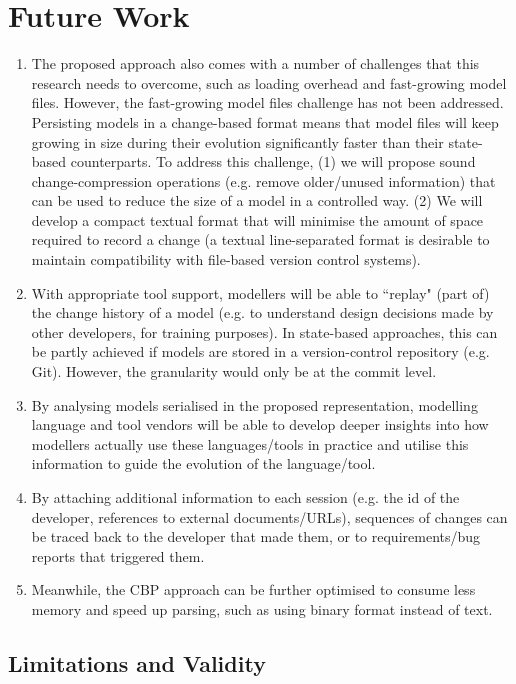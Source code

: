 \section{Future Work}

\begin{enumerate}
\item The proposed approach also comes with a number of challenges that this research needs to overcome, such as loading overhead and fast-growing model files. However, the fast-growing model files challenge has not been addressed. 
Persisting models in a change-based format means that model files will keep growing in size during their evolution significantly faster than their state-based counterparts. To address this challenge, (1) we will propose sound change-compression operations (e.g. remove older/unused information) that can be used to reduce the size of a model in a controlled way. (2) We will develop a compact textual format that will minimise the amount of space required to record a change (a textual line-separated format is desirable to maintain compatibility with file-based version control systems). 
\item With appropriate tool support, modellers will be able to ``replay" (part of) the change history of a model (e.g. to understand design decisions made by other developers, for training purposes). In state-based approaches, this can be partly achieved if models are stored in a version-control repository (e.g. Git). However, the granularity would only be at the commit level.
\item By analysing models serialised in the proposed representation, modelling language and tool vendors will be able to develop deeper insights into how modellers actually use these languages/tools in practice and utilise this information to guide the evolution of the language/tool.
\item By attaching additional information to each session (e.g. the id of the developer, references to external documents/URLs), sequences of changes can be traced back to the developer that made them, or to requirements/bug reports that triggered them.
\item Meanwhile, the CBP approach can be further optimised to consume less memory and speed up parsing, such as using binary format instead of text.

\end{enumerate}

\subsection{Limitations and Validity}
\label{sec:limitation_and_Threat_to_validity}

